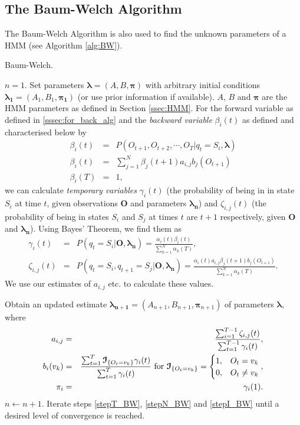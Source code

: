 \documentclass[12pt]{article}
\newcommand\I{{\cal I}}
\begin{document}
\subsection{The Baum-Welch Algorithm}\label{ssec:BW-Alg}
The Baum-Welch Algorithm is also used to find the unknown parameters of a HMM (see Algorithm \ref{alg:BW}).
\begin{algorithm}[h!]
\caption{Baum-Welch.}
\label{alg:BW}
\begin{algorithmic}[1] %
  \STATE $n=1$.
  \STATE Set parameters $\bm{\lambda}=(A,B,\bm{\pi})$ with arbitrary initial conditions $\bm{\lambda_1}=(A_1,B_1,\bm{\pi_1})$ (or use prior information if available). $A$, $B$ and $\bm{\pi}$ are the HMM parameters as defined in Section \ref{ssec:HMM}.
  \STATE For the forward variable as defined in \ref{sssec:for_back_alg} and the \emph{backward variable} $\beta_i(t)$ as defined and characterised below by
  \begin{eqnarray}
    \beta_i(t) &=& P(O_{t+1}, O_{t+2}, \cdots, O_T | q_t=S_i, \bm{\lambda}) \\
    \beta_i(t) &=& \sum_{j=1}^N \beta_j(t+1)a_{i,j}b_j(O_{t+1})\\
    \beta_i(T) &=& 1,
  \end{eqnarray}
  we can calculate \emph{temporary variables} $\gamma_i(t)$ (the probability of being in in state $S_i$ at time $t$, given observations $\bm{O}$ and parameters $\bm{\lambda_n}$) and $\zeta_{i,j}(t)$ (the probability of being in states $S_i$ and $S_j$ at times $t$ are $t+1$ respectively, given $\bm{O}$ and $\bm{\lambda_n}$). Using Bayes' Theorem, we find them as
  \begin{eqnarray}
    \gamma_i(t) &=& P(q_t=S_i|\bm{O},\bm{\lambda_n}) = \frac{\alpha_i(t)\beta_i(t)}{\sum_{k=1}^N\alpha_k(T)},\\
    \zeta_{i,j}(t) &=& P(q_t = S_i,q_{t+1}=S_j|\bm{O},\bm{\lambda_n}) = \frac{\alpha_i(t)a_{i,j}\beta_j(t+1)b_j(O_{t+1})}{\sum_{k=1}^N\alpha_k(T)}.
  \end{eqnarray}
  We use our estimates of $a_{i,j}$ etc. to calculate these values. \label{stepT_BW}
  
  \STATE Obtain an updated estimate $\bm{\lambda_{n+1}} = (A_{n+1},B_{n+1},\bm{\pi}_{n+1})$ of parameters $\bm{\lambda}$, where \label{stepN_BW}
  \begin{eqnarray}
    a_{i,j} &=& \frac{\sum_{i=1}^{T-1}\zeta_{i,j}(t)}{\sum_{t=1}^{T-1}\gamma_i(t)}, \\
    b_i(v_k) &=& \frac{\sum_{t=1}^T\bm{\I}_{\{O_t=v_k\}}\gamma_i(t)}{\sum_{t=1}^T\gamma_i(t)} \text{ for } \bm{\I}_{\{O_t=v_k\}}=\begin{cases} 
      1, & O_t=v_k \\
      0, & O_t\ne v_k
    \end{cases}, \\
    \pi_i &=& \gamma_i(1).
  \end{eqnarray}
  \STATE $n \leftarrow n+1$. \label{stepI_BW}
  \STATE Iterate steps \ref{stepT_BW}, \ref{stepN_BW} and \ref{stepI_BW} until a desired level of convergence is reached.
\end{algorithmic}
\end{algorithm}
\end{document}
